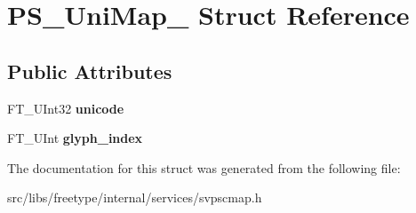 \hypertarget{struct_p_s___uni_map__}{
\section{PS\_\-UniMap\_\- Struct Reference}
\label{struct_p_s___uni_map__}
}
\subsection*{Public Attributes}
\begin{DoxyCompactItemize}
\item 
\hypertarget{struct_p_s___uni_map___a87c1f471eb4033fc5ed9d0f1ecaf35a1}{
FT\_\-UInt32 {\bfseries unicode}}
\label{struct_p_s___uni_map___a87c1f471eb4033fc5ed9d0f1ecaf35a1}

\item 
\hypertarget{struct_p_s___uni_map___a0d5b2e3c405aeab1f1059a3587125cfd}{
FT\_\-UInt {\bfseries glyph\_\-index}}
\label{struct_p_s___uni_map___a0d5b2e3c405aeab1f1059a3587125cfd}

\end{DoxyCompactItemize}


The documentation for this struct was generated from the following file:\begin{DoxyCompactItemize}
\item 
src/libs/freetype/internal/services/svpscmap.h\end{DoxyCompactItemize}

